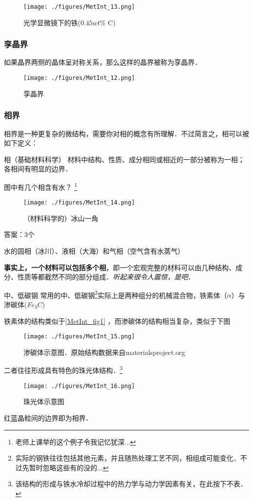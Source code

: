 \begin{figure}[ht]
\centering
\texttt{[image: ./figures/MetInt\_13.png]}
\caption{光学显微镜下的铁($0.45 wt\%$ C)} \label{MetInt_fig13}
\end{figure}

\subsubsection{孪晶界}
如果晶界两侧的晶体呈对称关系，那么这样的晶界被称为孪晶界．
\begin{figure}[ht]
\centering
\texttt{[image: ./figures/MetInt\_12.png]}
\caption{孪晶界} \label{MetInt_fig12}
\end{figure}

\subsubsection{相界}
相界是一种更复杂的微结构，需要你对相的概念有所理解．不过简言之，相可以被如下定义：
\begin{definition}{相（基础材料科学）}
材料中结构、性质、成分相同或相近的一部分被称为一相；各相间有明显的边界．
\end{definition}

\begin{example}{图中有几个相含有水？}
\footnote{老师上课举的这个例子令我记忆犹深...}
\begin{figure}[ht]
\centering
\texttt{[image: ./figures/MetInt\_14.png]}
\caption{（材料科学的）冰山一角} \label{MetInt_fig14}
\end{figure}
答案：3个

水的固相（冰川）、液相（大海）和气相（空气含有水蒸气）
\end{example}

\textbf{事实上，一个材料可以包括多个相}，即一个宏观完整的材料可以由几种结构、成分、性质等都截然不同的部分组成．\textsl{听起来很令人震惊，是吧}．

\begin{example}{中、低碳钢}
常用的中、低碳钢\footnote{实际的钢铁往往包括其他元素，并且随热处理工艺不同，相组成可能变化．不过先暂时忽略这些有的没的...}实际上是两种组分的机械混合物，铁素体（$\alpha$）与渗碳体($Fe_3C$)

铁素体的结构类似于\autoref{MetInt_fig1} ，而渗碳体的结构相当复杂，类似于下图
\begin{figure}[ht]
\centering
\texttt{[image: ./figures/MetInt\_15.png]}
\caption{渗碳体示意图．原始结构数据来自materialsproject.org} \label{MetInt_fig15}
\end{figure}
二者往往形成具有特色的珠光体结构．\footnote{该结构的形成与铁水冷却过程中的热力学与动力学因素有关，在此按下不表．}
\begin{figure}[ht]
\centering
\texttt{[image: ./figures/MetInt\_16.png]}
\caption{珠光体示意图} \label{MetInt_fig16}
\end{figure}
红蓝晶粒间的边界即为相界．
\end{example}

